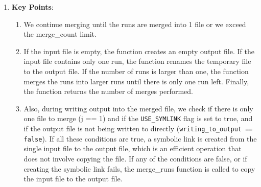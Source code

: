 \documentclass{article}
\begin{document}
\begin{itemize}
\begin{enumerate}[label=\star]
                    \item \textbf{Key Points}: 
                        \begin{enumerate}
                            \item We continue merging until the runs are merged into 1 file or we exceed the merge\_count limit.
                            \item If the input file is empty, the function creates an empty output file. If the input file contains only one run, the function renames the temporary file to the output file. If the number of runs is larger than one, the function merges the runs into larger runs until there is only one run left. Finally, the function returns the number of merges performed. 
                            \item Also, during writing output into the merged file, we check if there is only one file to merge (j == 1) and if the \verb|USE_SYMLINK| flag is set to true, and if the output file is not being written to directly (\verb|writing_to_output == false|). If all these conditions are true, a symbolic link is created from the single input file to the output file, which is an efficient operation that does not involve copying the file. If any of the conditions are false, or if creating the symbolic link fails, the merge\_runs function is called to copy the input file to the output file. 

\end{enumerate}
\end{enumerate}
\end{itemize}
\end{document}

